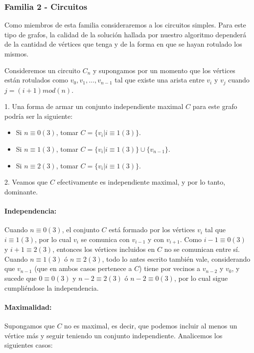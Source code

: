 \subsubsection*{Familia 2 - Circuitos}

Como miembros de esta familia consideraremos a los circuitos simples.  Para este tipo de grafos, la calidad de la solución hallada por nuestro algoritmo dependerá de la cantidad de vértices que tenga y de la forma en que se hayan rotulado los mismos.

Consideremos un circuito $C_{n}$ y supongamos por un momento que los vértices están rotulados como $v_0,v_1,...,v_{n-1}$ tal que existe una arista entre $v_i$ y $v_j$ cuando $j = (i+1) mod (n)$.

1. Una forma de armar un conjunto independiente maximal $C$ para este grafo podría ser la siguiente:

\begin{itemize}
\item Si $n \equiv 0 (3)$, tomar $C = \{v_i | i \equiv 1 (3)\}$.
\item Si $n \equiv 1 (3)$, tomar $C = \{v_i | i \equiv 1 (3)\} \cup \{v_{n-1}\}$.
\item Si $n \equiv 2 (3)$, tomar $C = \{v_i | i \equiv 1 (3)\}$.
\end{itemize}

2. Veamos que $C$ efectivamente es independiente maximal, y por lo tanto, dominante.

\paragraph*{Independencia:} Cuando $n \equiv 0 (3)$, el conjunto $C$ está formado por los vértices $v_i$ tal que $i \equiv 1 (3)$, por lo cual $v_i$ se comunica con $v_{i-1}$ y con $v_{i+1}$. Como $i-1 \equiv 0 (3)$ y $i+1 \equiv 2 (3)$, entonces los vértices incluidos en $C$ no se comunican entre sí. Cuando $n \equiv 1 (3)$ ó $n \equiv 2 (3)$, todo lo antes escrito también vale, considerando que $v_{n-1}$ (que en ambos casos pertenece a $C$) tiene por vecinos a $v_{n-2}$ y $v_{0}$, y sucede que $0 \equiv 0 (3)$ y $n-2 \equiv 2 (3)$ ó $n-2 \equiv 0 (3)$, por lo cual sigue cumpliéndose la independencia.

\paragraph*{Maximalidad:} Supongamos que $C$ no es maximal, es decir, que podemos incluir al menos un vértice más y seguir teniendo un conjunto independiente. Analicemos los siguientes casos:

